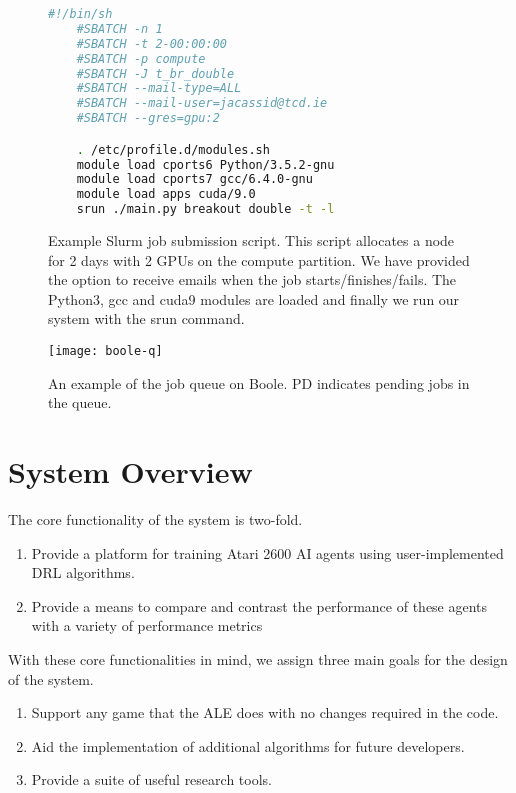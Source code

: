 \begin{figure}[H]
    \centering
    \begin{lstlisting}[language=bash]
    #!/bin/sh
    #SBATCH -n 1
    #SBATCH -t 2-00:00:00
    #SBATCH -p compute
    #SBATCH -J t_br_double
    #SBATCH --mail-type=ALL
    #SBATCH --mail-user=jacassid@tcd.ie
    #SBATCH --gres=gpu:2

    . /etc/profile.d/modules.sh
    module load cports6 Python/3.5.2-gnu
    module load cports7 gcc/6.4.0-gnu
    module load apps cuda/9.0
    srun ./main.py breakout double -t -l
    \end{lstlisting}
    \caption{Example Slurm job submission script. This script allocates a node for 2 days with 2 GPUs on the compute partition. We have provided the option to receive emails when the job starts/finishes/fails. The Python3, gcc and cuda9 modules are loaded and finally we run our system with the srun command.}
\end{figure}

\begin{figure}[h]
    \centering
    \texttt{[image: boole-q]}
    \caption{An example of the job queue on Boole. PD indicates pending jobs in the queue.}
    \label{fig:boolq}
\end{figure}

\section{System Overview} \label{sec:sys_overview}
The core functionality of the system is two-fold.
\begin{enumerate}
    \item Provide a platform for training Atari 2600 AI agents using user-implemented DRL algorithms.
    \item Provide a means to compare and contrast the performance of these agents with a variety of performance metrics
\end{enumerate}

With these core functionalities in mind, we assign three main goals for the design of the system.
\begin{enumerate}
    \item Support any game that the ALE does with no changes required in the code.
    \item Aid the implementation of additional algorithms for future developers.
    \item Provide a suite of useful research tools.
\end{enumerate}
